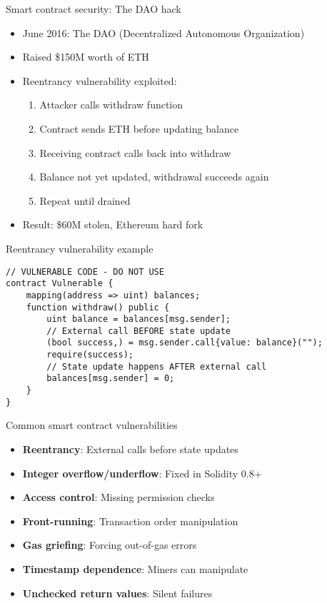 \documentclass[aspectratio=169, lualatex, handout]{beamer}
\begin{document}
\begin{frame}{Smart contract security: The DAO hack}
	\begin{itemize}
		\item June 2016: The DAO (Decentralized Autonomous Organization)
		\item Raised \$150M worth of ETH
		\item Reentrancy vulnerability exploited:
		      \begin{enumerate}
			      \item Attacker calls withdraw function
			      \item Contract sends ETH before updating balance
			      \item Receiving contract calls back into withdraw
			      \item Balance not yet updated, withdrawal succeeds again
			      \item Repeat until drained
		      \end{enumerate}
		\item Result: \$60M stolen, Ethereum hard fork
	\end{itemize}
\end{frame}

\begin{frame}[fragile]{Reentrancy vulnerability example}
	\begin{verbatim}
// VULNERABLE CODE - DO NOT USE
contract Vulnerable {
    mapping(address => uint) balances;
    function withdraw() public {
        uint balance = balances[msg.sender];
        // External call BEFORE state update
        (bool success,) = msg.sender.call{value: balance}("");
        require(success);
        // State update happens AFTER external call
        balances[msg.sender] = 0;
    }
}
 \end{verbatim}
\end{frame}

\begin{frame}{Common smart contract vulnerabilities}
	\begin{itemize}
		\item \textbf{Reentrancy}: External calls before state updates
		\item \textbf{Integer overflow/underflow}: Fixed in Solidity 0.8+
		\item \textbf{Access control}: Missing permission checks
		\item \textbf{Front-running}: Transaction order manipulation
		\item \textbf{Gas griefing}: Forcing out-of-gas errors
		\item \textbf{Timestamp dependence}: Miners can manipulate
		\item \textbf{Unchecked return values}: Silent failures
	\end{itemize}
\end{frame}
\end{document}
